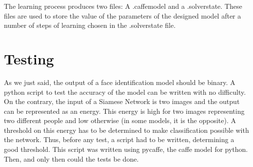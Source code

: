 The learning process produces two files: A .caffemodel and a .solverstate. These files are used to store the value of the parameters of the designed model after a number of steps of learning chosen in the .solverstate file.

\section{Testing}

As we just said, the output of a face identification model should be binary. A python script to test the accuracy of the model can be written with no difficulty. On the contrary, the input of a Siamese Network is two images and the output can be represented as an energy. This energy is high for two images representing two different people and low otherwise (in some models, it is the opposite). A threshold on this energy has to be determined to make classification possible with the network. Thus, before any test, a script had to be written, determining a good threshold. This script was written using pycaffe, the caffe model for python. Then, and only then could the tests be done.